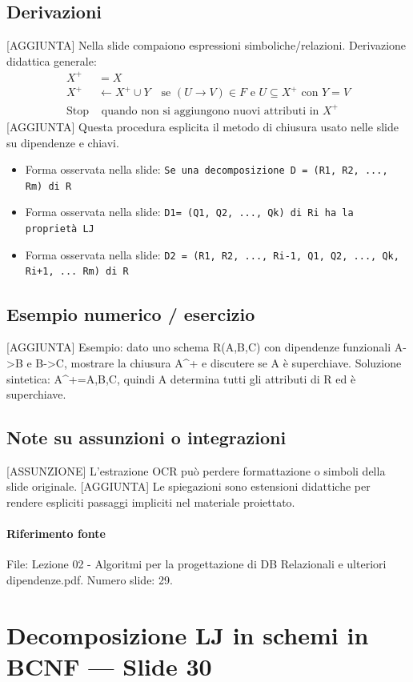 \documentclass[11pt]{article}
\begin{document}
\subsection*{Derivazioni}
[AGGIUNTA] Nella slide compaiono espressioni simboliche/relazioni. Derivazione didattica generale:
\begin{align*}
X^+ &= X \\
X^+ &\leftarrow X^+ \cup Y \quad \text{se } (U \to V) \in F \text{ e } U \subseteq X^+ \text{ con } Y=V \\
\text{Stop} &\text{ quando non si aggiungono nuovi attributi in } X^+
\end{align*}
[AGGIUNTA] Questa procedura esplicita il metodo di chiusura usato nelle slide su dipendenze e chiavi.
\begin{itemize}[leftmargin=*]
\item Forma osservata nella slide: \texttt{Se una decomposizione D = (R1, R2, ..., Rm) di R}
\item Forma osservata nella slide: \texttt{D1= (Q1, Q2, ..., Qk) di Ri ha la proprietà LJ}
\item Forma osservata nella slide: \texttt{D2 = (R1, R2, ..., Ri-1, Q1, Q2, ..., Qk, Ri+1, ... Rm) di R}
\end{itemize}
\subsection*{Esempio numerico / esercizio}
[AGGIUNTA] Esempio: dato uno schema R(A,B,C) con dipendenze funzionali A->B e B->C, mostrare la chiusura A^+ e discutere se A è superchiave. Soluzione sintetica: A^+={A,B,C}, quindi A determina tutti gli attributi di R ed è superchiave.
\subsection*{Note su assunzioni o integrazioni}
[ASSUNZIONE] L'estrazione OCR può perdere formattazione o simboli della slide originale.
[AGGIUNTA] Le spiegazioni sono estensioni didattiche per rendere espliciti passaggi impliciti nel materiale proiettato.
\paragraph{Riferimento fonte} File: Lezione 02 - Algoritmi per la progettazione di DB Relazionali e ulteriori dipendenze.pdf. Numero slide: 29.
\section{Decomposizione LJ in schemi in BCNF --- Slide 30}
\end{document}
